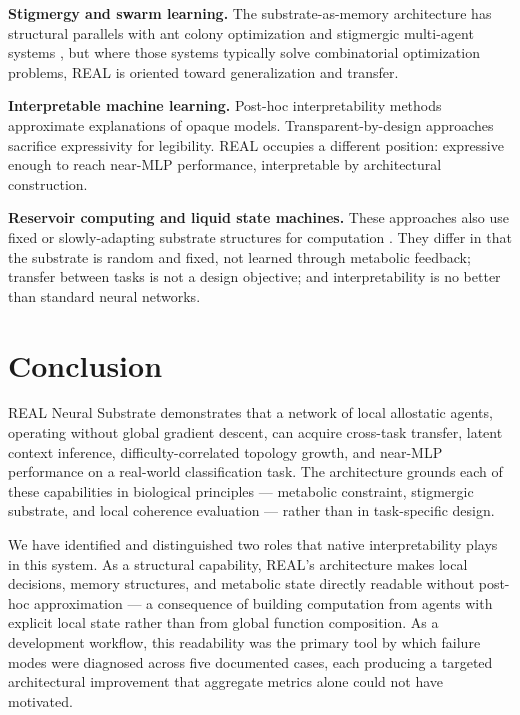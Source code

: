 \documentclass[letterpaper]{article}
\begin{document}
\textbf{Stigmergy and swarm learning.} The substrate-as-memory architecture has structural parallels with ant colony optimization \citep{placeholder} and stigmergic multi-agent systems \citep{placeholder}, but where those systems typically solve combinatorial optimization problems, REAL is oriented toward generalization and transfer.

\textbf{Interpretable machine learning.} Post-hoc interpretability methods \citep[SHAP, LIME, integrated gradients --- citations]{placeholder} approximate explanations of opaque models. Transparent-by-design approaches \citep[decision trees, rule-based systems --- citations]{placeholder} sacrifice expressivity for legibility. REAL occupies a different position: expressive enough to reach near-MLP performance, interpretable by architectural construction.

\textbf{Reservoir computing and liquid state machines.} These approaches also use fixed or slowly-adapting substrate structures for computation \citep{placeholder}. They differ in that the substrate is random and fixed, not learned through metabolic feedback; transfer between tasks is not a design objective; and interpretability is no better than standard neural networks.

\section{Conclusion}

REAL Neural Substrate demonstrates that a network of local allostatic agents, operating without global gradient descent, can acquire cross-task transfer, latent context inference, difficulty-correlated topology growth, and near-MLP performance on a real-world classification task. The architecture grounds each of these capabilities in biological principles — metabolic constraint, stigmergic substrate, and local coherence evaluation — rather than in task-specific design.

We have identified and distinguished two roles that native interpretability plays in this system. As a structural capability, REAL's architecture makes local decisions, memory structures, and metabolic state directly readable without post-hoc approximation — a consequence of building computation from agents with explicit local state rather than from global function composition. As a development workflow, this readability was the primary tool by which failure modes were diagnosed across five documented cases, each producing a targeted architectural improvement that aggregate metrics alone could not have motivated.
\end{document}
